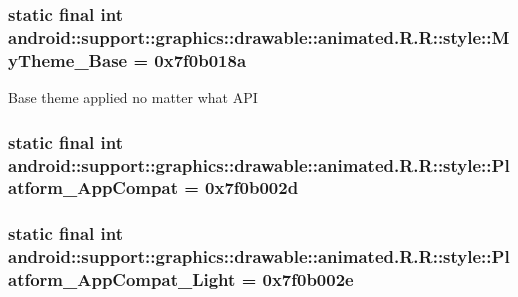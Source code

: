\hypertarget{classandroid_1_1support_1_1graphics_1_1drawable_1_1animated_1_1_r_1_1style_7fbe1ed7ea1ff4d822158bdadc3bf007}{
\subsubsection[{MyTheme\_\-Base}]{\setlength{\rightskip}{0pt plus 5cm}static final int android::support::graphics::drawable::animated.R.R::style::MyTheme\_\-Base = 0x7f0b018a}}
\label{classandroid_1_1support_1_1graphics_1_1drawable_1_1animated_1_1_r_1_1style_7fbe1ed7ea1ff4d822158bdadc3bf007}


Base theme applied no matter what API \hypertarget{classandroid_1_1support_1_1graphics_1_1drawable_1_1animated_1_1_r_1_1style_f01f25639e7b524689ff81c3f4dc1876}{
\subsubsection[{Platform\_\-AppCompat}]{\setlength{\rightskip}{0pt plus 5cm}static final int android::support::graphics::drawable::animated.R.R::style::Platform\_\-AppCompat = 0x7f0b002d}}
\label{classandroid_1_1support_1_1graphics_1_1drawable_1_1animated_1_1_r_1_1style_f01f25639e7b524689ff81c3f4dc1876}


\hypertarget{classandroid_1_1support_1_1graphics_1_1drawable_1_1animated_1_1_r_1_1style_a05aba2cee1f2f6f5940b531867e51a7}{
\subsubsection[{Platform\_\-AppCompat\_\-Light}]{\setlength{\rightskip}{0pt plus 5cm}static final int android::support::graphics::drawable::animated.R.R::style::Platform\_\-AppCompat\_\-Light = 0x7f0b002e}}
\label{classandroid_1_1support_1_1graphics_1_1drawable_1_1animated_1_1_r_1_1style_a05aba2cee1f2f6f5940b531867e51a7}



